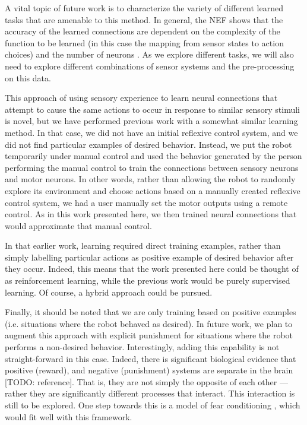 \documentclass[conference]{IEEEtran}
\begin{document}
\begin{enumerate}[label=\Alph*]
A vital topic of future work is to characterize the variety of different
learned tasks that are amenable to this method.  In general, the NEF shows
that the accuracy of the learned connections are dependent on the complexity
of the function to be learned (in this case the mapping from sensor states to
action choices) and the number of neurons \cite{eliasmith2004neural}.  As we explore different tasks,
we will also need to explore different combinations of sensor systems and
the pre-processing on this data.  

This approach of using sensory experience to learn neural connections
that attempt to cause the same actions to occur in response to similar
sensory stimuli is novel, but we have performed previous work \cite{conradt2014trainable}
with a somewhat similar learning method. In that case, we did not have an 
initial reflexive control system, and we did not find particular examples of 
desired behavior. Instead, we put the robot temporarily under manual control 
and used the behavior generated by the person performing the manual control 
to train the connections between sensory neurons and motor neurons.  In other
words, rather than allowing the robot to randomly explore its environment and
choose actions based on a manually created reflexive control system, we had
a user manually set the motor outputs using a remote control.  As in this work
presented here, we then trained neural connections that would approximate that
manual control.  

In that earlier work, learning required direct training examples, rather than 
simply labelling particular actions as positive example of desired behavior 
after they occur.  Indeed, this means that the work presented here could be 
thought of as reinforcement learning, while the previous work would be purely 
supervised learning. Of course, a hybrid approach could be pursued. 

Finally, it should be noted that we are only training based on positive 
examples (i.e. situations where the robot behaved as desired). In future work,
we plan to augment this approach with explicit punishment for situations where 
the robot performs a non-desired behavior. Interestingly, adding this capability
is not straight-forward in this case.  Indeed, there is significant biological 
evidence that positive (reward), and negative (punishment) systems are separate 
in the brain [TODO: reference]. That is, they are not simply the opposite of 
each other –-- rather they are significantly different processes that interact. 
This interaction is still to be explored. One step towards this is a model
of fear conditioning \cite{kolbeck2013fear}, which would fit well with this framework.



\end{enumerate}
\end{document}
